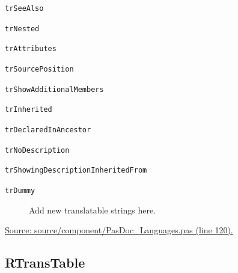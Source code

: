 \documentclass{report}
\newif\ifpdf
\begin{document}
\begin{list}{}
\begin{description}
\item[\texttt{trSeeAlso}] \label{PasDoc_Languages-trSeeAlso}
\index{}
 
\item[\texttt{trNested}] \label{PasDoc_Languages-trNested}
\index{}
 
\item[\texttt{trAttributes}] \label{PasDoc_Languages-trAttributes}
\index{}
 
\item[\texttt{trSourcePosition}] \label{PasDoc_Languages-trSourcePosition}
\index{}
 
\item[\texttt{trShowAdditionalMembers}] \label{PasDoc_Languages-trShowAdditionalMembers}
\index{}
 
\item[\texttt{trInherited}] \label{PasDoc_Languages-trInherited}
\index{}
 
\item[\texttt{trDeclaredInAncestor}] \label{PasDoc_Languages-trDeclaredInAncestor}
\index{}
 
\item[\texttt{trNoDescription}] \label{PasDoc_Languages-trNoDescription}
\index{}
 
\item[\texttt{trShowingDescriptionInheritedFrom}] \label{PasDoc_Languages-trShowingDescriptionInheritedFrom}
\index{}
 
\item[\texttt{trDummy}] \label{PasDoc_Languages-trDummy}
\index{}
Add new translatable strings here.
\end{description}
\par
\href{https://github.com/pasdoc/pasdoc/blob/master/source/component/PasDoc_Languages.pas#L120}{Source: source/component/PasDoc{\_}Languages.pas (line 120).}

\end{list}
\ifpdf
\subsection*{\large{\textbf{RTransTable}}\normalsize\hspace{1ex}\hrulefill}
\else
\end{document}
